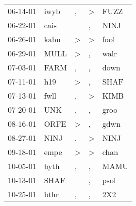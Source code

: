 \begin{supertabular}{p{0.07\textwidth}p{0.06\textwidth}p{0.02\textwidth}p{0.02\textwidth}p{0.06\textwidth}}
          06-14-01\textsuperscript{} &           iwyb\textsuperscript{} &                , &     \textgreater &           FUZZ\textsuperscript{} \\
          06-22-01\textsuperscript{} &           cais\textsuperscript{} &                  &                , &           NINJ\textsuperscript{} \\
          06-26-01\textsuperscript{} &           kabu\textsuperscript{} &     \textgreater &     \textgreater &           fool\textsuperscript{} \\
          06-29-01\textsuperscript{} &           MULL\textsuperscript{} &     \textgreater &                , &           walr\textsuperscript{} \\
          07-03-01\textsuperscript{} &           FARM\textsuperscript{} &                , &                , &           down\textsuperscript{} \\
          07-11-01\textsuperscript{} &            h19\textsuperscript{} &     \textgreater &                , &           SHAF\textsuperscript{} \\
          07-13-01\textsuperscript{} &           fwll\textsuperscript{} &                , &     \textgreater &           KIMB\textsuperscript{} \\
          07-20-01\textsuperscript{} &            UNK\textsuperscript{} &                , &                , &           groo\textsuperscript{} \\
          08-16-01\textsuperscript{} &           ORFE\textsuperscript{} &     \textgreater &                , &           gdwn\textsuperscript{} \\
          08-27-01\textsuperscript{} &           NINJ\textsuperscript{} &                , &     \textgreater &           NINJ\textsuperscript{} \\
          09-18-01\textsuperscript{} &           empe\textsuperscript{} &     \textgreater &     \textgreater &           chan\textsuperscript{} \\
          10-05-01\textsuperscript{} &           byth\textsuperscript{} &                , &                , &           MAMU\textsuperscript{} \\
          10-13-01\textsuperscript{} &           SHAF\textsuperscript{} &                  &                , &           psol\textsuperscript{} \\
          10-25-01\textsuperscript{} &           bthr\textsuperscript{} &                , &                , &            2X2\textsuperscript{} \\

\end{supertabular}
